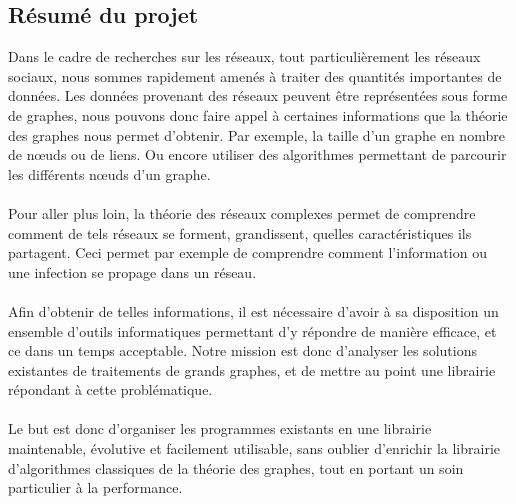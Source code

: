 \begin{titlepage}


\tableofcontents


\newpage
\begin{center}
\begin{bf}
\section{Résumé du projet}
\end{bf}
\end{center}

\vspace{1cm}

{
Dans le cadre de recherches sur les réseaux, tout particulièrement les réseaux sociaux, nous sommes rapidement amenés à traiter des quantités importantes de données. Les données provenant des réseaux peuvent être représentées sous forme de graphes, nous pouvons donc faire appel à certaines informations que la théorie des graphes nous permet d'obtenir. Par exemple, la taille d'un graphe en nombre de nœuds ou de liens. Ou encore utiliser des algorithmes permettant de parcourir les différents nœuds d'un graphe.
~\\ \\ 
Pour aller plus loin, la théorie des réseaux complexes permet de comprendre comment de tels réseaux se forment, grandissent, quelles caractéristiques ils partagent. Ceci permet par exemple de comprendre comment l'information ou une infection se propage dans un réseau.
~\\ \\
Afin d'obtenir de telles informations, il est nécessaire d'avoir à sa disposition un ensemble d'outils informatiques permettant d'y répondre de manière efficace, et ce dans un temps acceptable. Notre mission est donc d'analyser les solutions existantes de traitements de grands graphes, et de mettre au point une librairie répondant à cette problématique.
~\\\\
Le but est donc d'organiser les programmes existants en une librairie maintenable, évolutive et facilement
utilisable, sans oublier d'enrichir la librairie d'algorithmes classiques de la théorie des graphes, tout en portant un soin particulier à la performance.
}


\end{titlepage}

